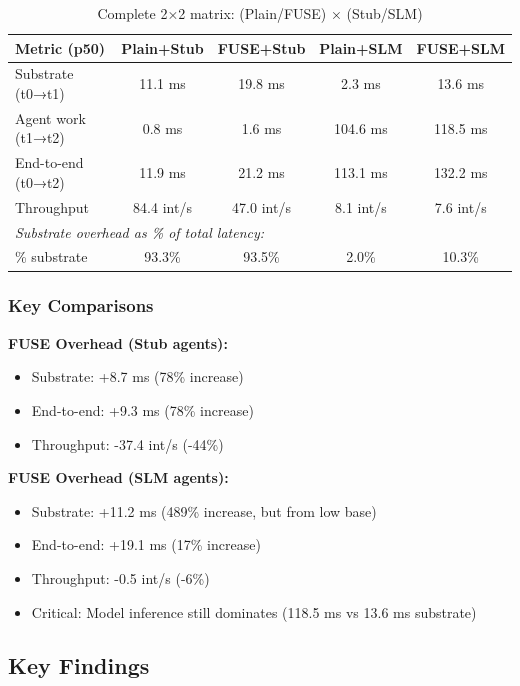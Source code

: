 \documentclass[11pt]{article}
\begin{document}
\begin{table}[h]
\centering
\begin{tabular}{lcccc}
\toprule
\textbf{Metric (p50)} & \textbf{Plain+Stub} & \textbf{FUSE+Stub} & \textbf{Plain+SLM} & \textbf{FUSE+SLM} \\
\midrule
Substrate (t0→t1) & 11.1 ms & 19.8 ms & 2.3 ms & 13.6 ms \\
Agent work (t1→t2) & 0.8 ms & 1.6 ms & 104.6 ms & 118.5 ms \\
End-to-end (t0→t2) & 11.9 ms & 21.2 ms & 113.1 ms & 132.2 ms \\
Throughput & 84.4 int/s & 47.0 int/s & 8.1 int/s & 7.6 int/s \\
\midrule
\multicolumn{5}{l}{\textit{Substrate overhead as \% of total latency:}} \\
\quad \% substrate & 93.3\% & 93.5\% & 2.0\% & 10.3\% \\
\bottomrule
\end{tabular}
\caption{Complete 2×2 matrix: (Plain/FUSE) × (Stub/SLM)}
\end{table}

\subsubsection{Key Comparisons}

\textbf{FUSE Overhead (Stub agents):}
\begin{itemize}
\item Substrate: +8.7 ms (78\% increase)
\item End-to-end: +9.3 ms (78\% increase)
\item Throughput: -37.4 int/s (-44\%)
\end{itemize}

\textbf{FUSE Overhead (SLM agents):}
\begin{itemize}
\item Substrate: +11.2 ms (489\% increase, but from low base)
\item End-to-end: +19.1 ms (17\% increase)
\item Throughput: -0.5 int/s (-6\%)
\item Critical: Model inference still dominates (118.5 ms vs 13.6 ms substrate)
\end{itemize}

\subsection{Key Findings}
\end{document}
